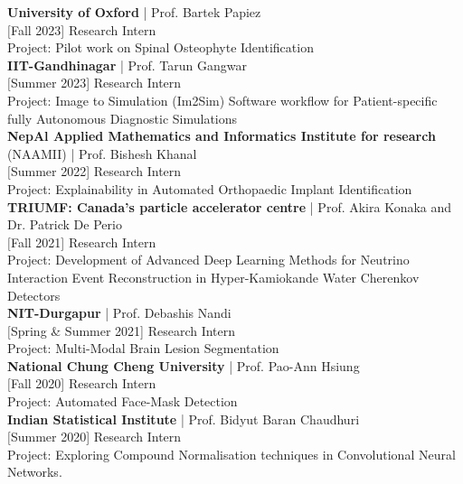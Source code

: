 \documentclass[letterpaper,10pt]{article}
\begin{document}
\textbf{University of Oxford} | Prof. Bartek Papiez \\ [0.1cm]
$[$Fall 2023] Research Intern \\ [0.1cm]
Project: Pilot work on Spinal Osteophyte Identification \\ [0.2cm]

\textbf{IIT-Gandhinagar}  | Prof. Tarun Gangwar \\ [0.1cm]
$[$Summer 2023] Research Intern \\ [0.1cm]
Project: Image to Simulation (Im2Sim) Software workflow for Patient-specific fully Autonomous Diagnostic Simulations \\[0.2cm]

\textbf{NepAl Applied Mathematics and Informatics Institute for research} (NAAMII) | Prof. Bishesh Khanal \\ [0.1cm]
$[$Summer 2022] Research Intern \\ [0.1cm]
Project: Explainability in Automated Orthopaedic Implant Identification \\[0.2cm]

\textbf{TRIUMF: Canada's particle accelerator centre}  | Prof. Akira Konaka and Dr. Patrick De Perio \\ [0.1cm]
$[$Fall 2021] Research Intern \\ [0.1cm]
Project: Development of Advanced Deep Learning Methods for Neutrino Interaction Event Reconstruction in Hyper-Kamiokande Water Cherenkov Detectors \\[0.2cm]

\textbf{NIT-Durgapur} | Prof. Debashis Nandi \\ [0.1cm]
$[$Spring \& Summer 2021] Research Intern \\ [0.1cm]
Project: Multi-Modal Brain Lesion Segmentation \\[0.2cm]

\textbf{National Chung Cheng University} | Prof. Pao-Ann Hsiung \\ [0.1cm]
$[$Fall 2020] Research Intern \\ [0.1cm]
Project: Automated Face-Mask Detection \\ [0.2cm]

\textbf{Indian Statistical Institute} | Prof. Bidyut Baran Chaudhuri \\ [0.1cm]
$[$Summer 2020] Research Intern \\ [0.1cm]
Project: Exploring Compound Normalisation techniques in Convolutional Neural Networks. \\[0.2cm]
\end{document}
